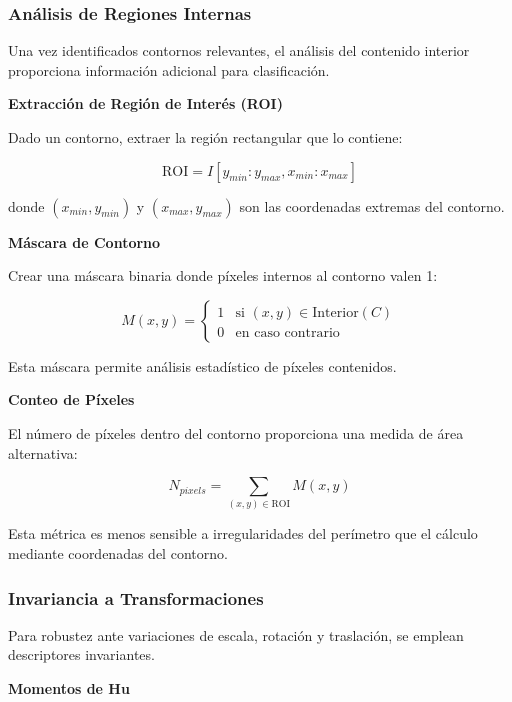 \subsubsection{Análisis de Regiones Internas}

Una vez identificados contornos relevantes, el análisis del contenido interior proporciona información adicional para clasificación.

\textbf{Extracción de Región de Interés (ROI)}

Dado un contorno, extraer la región rectangular que lo contiene:

\begin{equation}
\text{ROI} = I[y_{min}:y_{max}, x_{min}:x_{max}]
\end{equation}

donde $(x_{min}, y_{min})$ y $(x_{max}, y_{max})$ son las coordenadas extremas del contorno.

\textbf{Máscara de Contorno}

Crear una máscara binaria donde píxeles internos al contorno valen 1:

\begin{equation}
M(x,y) = \begin{cases}
1 & \text{si } (x,y) \in \text{Interior}(C) \\
0 & \text{en caso contrario}
\end{cases}
\end{equation}

Esta máscara permite análisis estadístico de píxeles contenidos.

\textbf{Conteo de Píxeles}

El número de píxeles dentro del contorno proporciona una medida de área alternativa:

\begin{equation}
N_{pixels} = \sum_{(x,y) \in \text{ROI}} M(x,y)
\end{equation}

Esta métrica es menos sensible a irregularidades del perímetro que el cálculo mediante coordenadas del contorno.

\subsubsection{Invariancia a Transformaciones}

Para robustez ante variaciones de escala, rotación y traslación, se emplean descriptores invariantes.

\textbf{Momentos de Hu}

